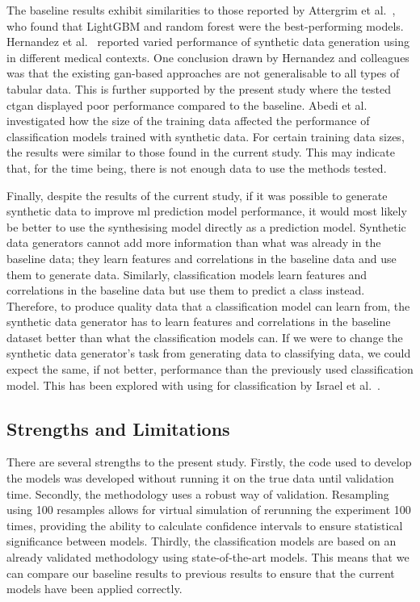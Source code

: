 \documentclass[12pt, a4paper]{article}
\begin{document}
The baseline results exhibit similarities to those reported by Attergrim et al.~\cite{attergrim_predicting_2023}, who
found that LightGBM and random forest were the best-performing models. Hernandez et al.~\cite{hernandez_synthetic_2022}
reported varied performance of synthetic data generation using  in different medical contexts. One
conclusion drawn by Hernandez and colleagues was that the existing \acrlong{gan}-based approaches are not generalisable
to all types of tabular data. This is further supported by the present study where the tested \acrshort{ctgan}
displayed poor performance compared to the baseline. Abedi et al.~\cite{abedi_gan-based_2022} investigated how the size
of the training data affected the performance of classification models trained with synthetic data. For certain
training data sizes, the results were similar to those found in the current study. This may indicate that, for the time
being, there is not enough data to use the methods tested.

Finally, despite the results of the current study, if it was possible to generate synthetic data to improve
\acrshort{ml} prediction model performance, it would most likely be better to use the synthesising model directly as a
prediction model. Synthetic data generators cannot add more information than what was already in the baseline data;
they learn features and correlations in the baseline data and use them to generate data. Similarly, classification
models learn features and correlations in the baseline data but use them to predict a class instead. Therefore, to
produce quality data that a classification model can learn from, the synthetic data generator has to learn features and
correlations in the baseline dataset better than what the classification models can. If we were to change the synthetic
data generator's task from generating data to classifying data, we could expect the same, if not better, performance
than the previously used classification model. This has been explored with using  for classification by
Israel et al.~\cite{israel_generative_2017}.

\subsection{Strengths and Limitations}
There are several strengths to the present study. Firstly, the code used to develop the models was developed without
running it on the true data until validation time. Secondly, the methodology uses a robust way of validation.
Resampling using 100 resamples allows for virtual simulation of rerunning the experiment 100 times, providing the
ability to calculate confidence intervals to ensure statistical significance between models. Thirdly, the
classification models are based on an already validated methodology using state-of-the-art models. This means that we
can compare our baseline results to previous results to ensure that the current models have been applied correctly.
\end{document}
